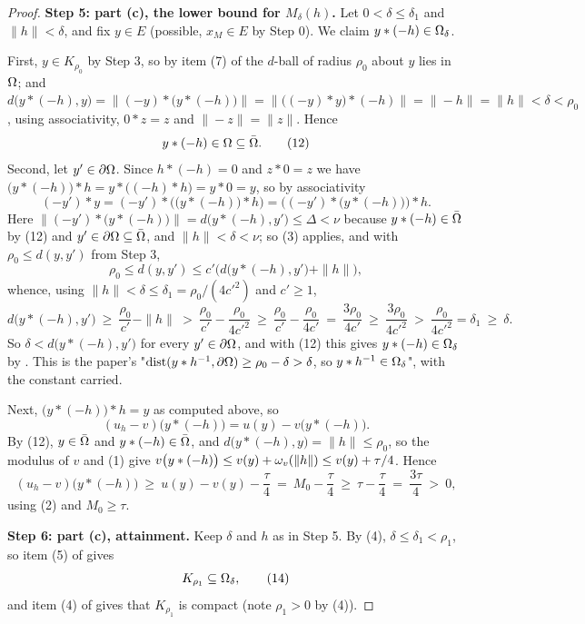 \begin{proof}
\medskip\noindent\textbf{Step 5: part (c), the lower bound for $M_\delta(h)$.} Let
$0<\delta\le\delta_1$ and $\|h\|<\delta$, and fix $y\in E$ (possible, $x_M\in E$ by Step 0).
We claim $y*(-h)\in\Omega_\delta$.

First, $y\in K_{\rho_0}$ by Step 3, so by item (7) of  the
$d$-ball of radius $\rho_0$ about $y$ lies in $\Omega$; and
$d\big(y*(-h),y\big)=\|(-y)*\big(y*(-h)\big)\|=\|\big((-y)*y\big)*(-h)\|=\|-h\|=\|h\|<\delta<\rho_0$,
using associativity, $0*z=z$ and $\|-z\|=\|z\|$. Hence
\[
 y*(-h)\in\Omega\subseteq\bar{\Omega} . \tag{12}
\]
Second, let $y'\in\partial\Omega$. Since $h*(-h)=0$ and $z*0=z$ we have
$\big(y*(-h)\big)*h=y*\big((-h)*h\big)=y*0=y$, so by associativity
\[
 (-y')*y=(-y')*\Big(\big(y*(-h)\big)*h\Big)=\Big((-y')*\big(y*(-h)\big)\Big)*h .
\]
Here $\|(-y')*\big(y*(-h)\big)\|=d\big(y*(-h),y'\big)\le\Delta<\nu$ because
$y*(-h)\in\bar{\Omega}$ by (12) and $y'\in\partial\Omega\subseteq\bar{\Omega}$, and $\|h\|<\delta<\nu$; so
(3) applies, and with $\rho_0\le d(y,y')$ from Step 3,
\[
 \rho_0\le d(y,y')\le c'\Big(d\big(y*(-h),y'\big)+\|h\|\Big),
\]
whence, using $\|h\|<\delta\le\delta_1=\rho_0/(4c'^{2})$ and $c'\ge1$,
\[
 d\big(y*(-h),y'\big)\ \ge\ \frac{\rho_0}{c'}-\|h\|\ >\ \frac{\rho_0}{c'}-\frac{\rho_0}{4c'^{2}}
 \ \ge\ \frac{\rho_0}{c'}-\frac{\rho_0}{4c'}\ =\ \frac{3\rho_0}{4c'}\ \ge\ \frac{3\rho_0}{4c'^{2}}
 \ >\ \frac{\rho_0}{4c'^{2}}=\delta_1\ \ge\ \delta .
\]
So $\delta<d\big(y*(-h),y'\big)$ for every $y'\in\partial\Omega$, and with (12) this gives
$y*(-h)\in\Omega_\delta$ by . This is the paper's
"$\operatorname{dist}(y*h^{-1},\partial\Omega)\ge\rho_0-\delta>\delta$, so $y*h^{-1}\in\Omega_\delta$", with the
constant carried.

Next, $\big(y*(-h)\big)*h=y$ as computed above, so
\[
 (u_h-v)\big(y*(-h)\big)=u(y)-v\big(y*(-h)\big).
\]
By (12), $y\in\bar{\Omega}$ and $y*(-h)\in\bar{\Omega}$, and
$d\big(y*(-h),y\big)=\|h\|\le\rho_0$, so the modulus of $v$ and (1) give
$v\big(y*(-h)\big)\le v(y)+\omega_v(\|h\|)\le v(y)+\tau/4$. Hence
\[
 (u_h-v)\big(y*(-h)\big)\ \ge\ u(y)-v(y)-\frac\tau4\ =\ M_0-\frac\tau4\ \ge\ \tau-\frac\tau4
 \ =\ \frac{3\tau}4\ >\ 0 , \tag{13}
\]
using (2) and $M_0\ge\tau$.

\medskip\noindent\textbf{Step 6: part (c), attainment.} Keep $\delta$ and $h$ as in Step 5.
By (4), $\delta\le\delta_1<\rho_1$, so item (5) of  gives
\[
 K_{\rho_1}\subseteq\Omega_\delta , \tag{14}
\]
and item (4) of  gives that $K_{\rho_1}$ is compact (note
$\rho_1>0$ by (4)).


\end{proof}
